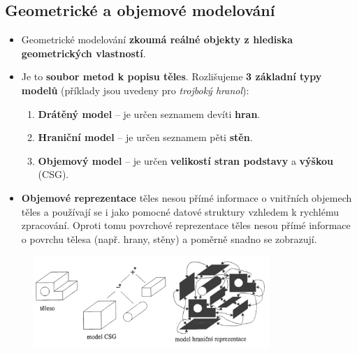 
\subsection{Geometrické a objemové modelování}
\begin{itemize}
	\item Geometrické modelování \textbf{zkoumá reálné objekty z hlediska geometrických vlastností}.
	\item Je to \textbf{soubor metod k popisu těles}. Rozlišujeme \textbf{3 základní typy modelů} (příklady jsou uvedeny pro \textit{trojboký hranol}):
	\begin{enumerate}
		\item \textbf{Drátěný model} --  je určen seznamem devíti \textbf{hran}.
		\item \textbf{Hraniční model} -- je určen seznamem pěti \textbf{stěn}.
		\item \textbf{Objemový model} -- je určen \textbf{velikostí stran podstavy} a \textbf{výškou} (CSG).
	\end{enumerate}
\item \textbf{Objemové reprezentace} těles nesou přímé informace o vnitřních objemech těles a používají se i jako pomocné datové struktury vzhledem k rychlému zpracování. Oproti tomu povrchové reprezentace těles nesou přímé informace o povrchu tělesa (např. hrany, stěny) a poměrně snadno se zobrazují.
\end{itemize}

\begin{figure}[H]
	\centering
	\includegraphics[width=0.8\textwidth]{assets/4_modely}
\end{figure}

